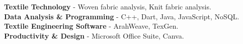 

  
  \textbf{Textile Technology} - Woven fabric analysis, Knit fabric analysis. \\
   \vspace{1mm}
  \textbf{Data Analysis \& Programming} - C++, Dart, Java, JavaScript, NoSQL. \\
   \vspace{1mm}
  \textbf{Textile Engineering Software} - ArahWeave, TexGen. \\
   \vspace{1mm}
  \textbf{Productivity \& Design} - Microsoft Office Suite, Canva. 
